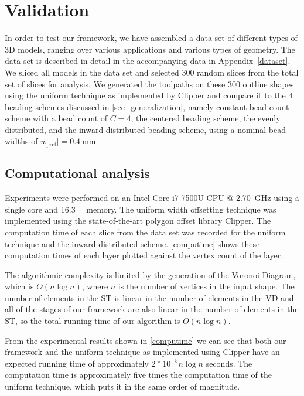 \section{Validation}
In order to test our framework, we have assembled a data set of different types of 3D models, ranging over various applications and various types of geometry.
The data set is described in detail in the accompanying data in Appendix~\ref{dataset}.
We sliced all models in the data set and selected 300 random slices from the total set of slices for analysis.
We generated the toolpaths on these 300 outline shapes using the uniform technique as implemented by Clipper and compare it to the 4 beading schemes discussed in \cref{sec_generalization}, namely constant bead count scheme with a bead count of $C=4$, the centered beading scheme, the evenly distributed, and the inward distributed beading scheme, using a nominal bead widths of $w_\text{pref}] = \SI{0.4}{\milli\meter}$.



\subsection{Computational analysis}
Experiments were performed on an Intel Core i7-7500U CPU @ \SI{2.70}{\giga\hertz} using a single core and \SI{16.3}{\giga\byte} memory.
The uniform width offsetting technique was implemented using the state-of-the-art polygon offset library Clipper. \cite{johnson2014clipper}
The computation time of each slice from the data set was recorded for the uniform technique and the inward distributed scheme. 
\cref{computime} shows these computation times of each layer plotted against the vertex count of the layer.

The algorithmic complexity is limited by the generation of the Voronoi Diagram, which is $O(n \log n)$, where $n$ is the number of vertices in the input shape.
The number of elements in the ST is linear in the number of elements in the VD
and all of the stages of our framework are also linear in the number of elements in the ST,
so the total running time of our algorithm is $O(n \log n)$.

From the experimental results shown in \cref{computime} we can see that both our framework and the uniform technique as implemented using Clipper have an expected running time of approximately $2*10^{-5} n \log n$ seconds.
The computation time is approximately five times the computation time of the uniform technique, which puts it in the same order of magnitude.

